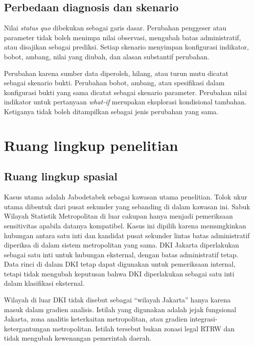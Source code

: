 \documentclass[11pt,a4paper,oneside,openany,indonesian]{report}
\begin{document}
\subsection{Perbedaan diagnosis dan
skenario}\label{perbedaan-diagnosis-dan-skenario}

Nilai \emph{status quo} dibekukan sebagai garis dasar. Perubahan
penggeser atau parameter tidak boleh menimpa nilai observasi, mengubah
batas administratif, atau disajikan sebagai prediksi. Setiap skenario
menyimpan konfigurasi indikator, bobot, ambang, nilai yang diubah, dan
alasan substantif perubahan.

Perubahan karena sumber data diperoleh, hilang, atau turun mutu dicatat
sebagai skenario bukti. Perubahan bobot, ambang, atau
spesifikasi dalam konfigurasi bukti yang sama dicatat sebagai
skenario parameter. Perubahan nilai indikator untuk pertanyaan
\emph{what-if} merupakan eksplorasi kondisional tambahan. Ketiganya
tidak boleh ditampilkan sebagai jenis perubahan yang sama.

\section{Ruang lingkup penelitian}\label{ruang-lingkup-penelitian}

\subsection{Ruang lingkup spasial}\label{ruang-lingkup-spasial}

Kasus utama adalah Jabodetabek sebagai kawasan utama penelitian. Tolok
ukur utama dibentuk dari pusat sekunder yang sebanding di dalam kawasan
ini. Sabuk Wilayah Statistik Metropolitan di luar cakupan hanya menjadi
pemeriksaan sensitivitas apabila datanya kompatibel. Kasus ini dipilih karena memungkinkan
hubungan antara satu inti dan kandidat pusat sekunder lintas batas
administratif diperiksa di dalam sistem metropolitan yang sama. DKI
Jakarta diperlakukan sebagai satu inti untuk hubungan eksternal, dengan
batas administratif tetap. Data rinci di dalam DKI tetap dapat digunakan
untuk pemeriksaan internal, tetapi tidak mengubah keputusan bahwa DKI
diperlakukan sebagai satu inti dalam klasifikasi eksternal.

Wilayah di luar DKI tidak disebut sebagai ``wilayah Jakarta'' hanya
karena masuk dalam gradien analisis. Istilah yang digunakan adalah
jejak fungsional Jakarta, zona analitis keterkaitan metropolitan, atau
gradien integrasi-ketergantungan metropolitan. Istilah tersebut bukan zonasi legal RTRW dan tidak
mengubah kewenangan pemerintah daerah.
\end{document}
